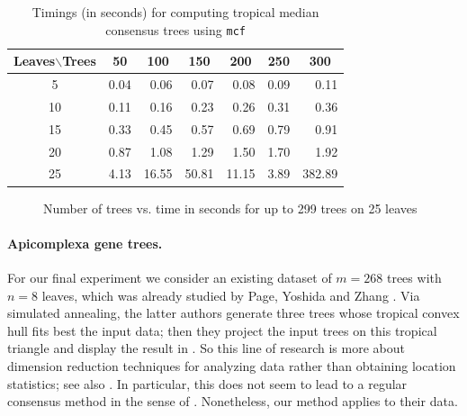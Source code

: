 \documentclass[a4paper,12pt]{amsart}
\theoremstyle{remark}
\newcommand\mcf{\texttt{mcf}\xspace}
\begin{document}
\begin{table}[bh]
  \caption{Timings (in seconds) for computing tropical median consensus trees using \mcf \cite{mcf}}
  \label{table:mcf-times}
  \centering
  \begin{tabular}{crrrrrr}
  	\toprule
  	Leaves$\backslash$Trees  & \multicolumn{1}{c}{50} & \multicolumn{1}{c}{100} & \multicolumn{1}{c}{150} & \multicolumn{1}{c}{200} & \multicolumn{1}{c}{250} & \multicolumn{1}{c}{300}\\
  	\midrule
  	5 & 0.04 & 0.06 & 0.07 & 0.08 & 0.09 & 0.11 \\ 
  	10 & 0.11 & 0.16 & 0.23 & 0.26 & 0.31 & 0.36 \\ 
  	15 & 0.33 & 0.45 & 0.57 & 0.69 & 0.79 & 0.91 \\ 
  	20 & 0.87 & 1.08 & 1.29 & 1.50 & 1.70 & 1.92 \\
  	25 & 4.13 & 16.55 & 50.81 & 11.15 & 3.89 & 382.89 \\
  	\bottomrule 
  \end{tabular} 
\end{table}

\begin{figure}[th]
    \centering
    \caption{Number of trees vs. time in seconds for up to 299 trees on 25 leaves}
    \label{fig:times_graph}
\end{figure}

\paragraph{Apicomplexa gene trees.}
For our final experiment we consider an existing dataset of $m=268$ trees with $n=8$ leaves, which was already studied by Page, Yoshida and Zhang \cite[\S6.2]{Page+Yoshida+Zhang:2020}.
Via simulated annealing, the latter authors generate three trees whose tropical convex hull fits best the input data; then they project the input trees on this tropical triangle and display the result in \cite[Fig.~6]{Page+Yoshida+Zhang:2020}.
So this line of research is more about dimension reduction techniques for analyzing data rather than obtaining location statistics; see also \cite{YoshidaZhangZhang:2019}.
In particular, this does not seem to lead to a regular consensus method in the sense of \cite{Bryant+Francis+Steel:2017}.
Nonetheless, our method applies to their data.
\end{document}
